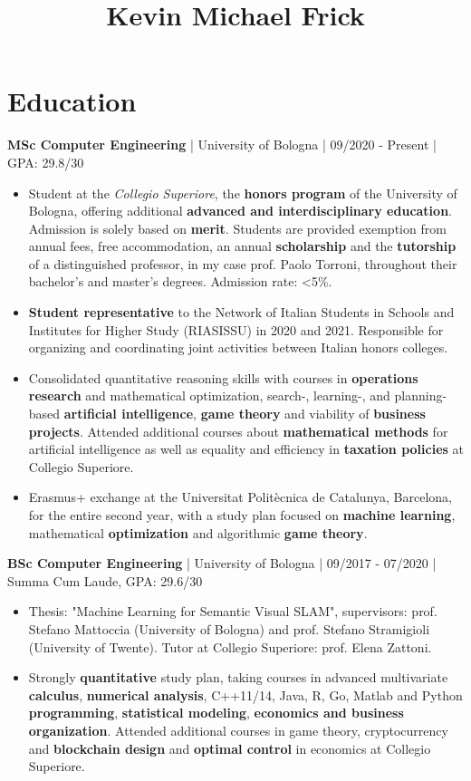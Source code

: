 \documentclass[10pt, a4paper]{extarticle}
\title{Kevin Michael Frick}
\author{}
\begin{document}
\maketitle
\vspace{-0.8em}
\hrulefill


\section*{Education}

\textbf{MSc Computer Engineering} | University of Bologna | 09/2020 - Present | GPA: 29.8/30
\begin{itemize}
  \item Student at the \emph{Collegio Superiore}, the \textbf{honors program} of the University of Bologna, offering additional \textbf{advanced and interdisciplinary education}.
    Admission is solely based on \textbf{merit}.
    Students are provided exemption from annual fees, free accommodation, an annual \textbf{scholarship} and the \textbf{tutorship} of a distinguished professor, in my case prof. Paolo Torroni, throughout their bachelor's and master's degrees.
    Admission rate: <5\%.
  \item \textbf{Student representative} to the Network of Italian Students in Schools and Institutes for Higher Study (RIASISSU) in 2020 and 2021.
    Responsible for organizing and coordinating joint activities between Italian honors colleges.
  \item Consolidated quantitative reasoning skills with courses in \textbf{operations research} and mathematical optimization, search-, learning-, and planning-based \textbf{artificial intelligence}, \textbf{game theory} and viability of \textbf{business projects}.
    Attended additional courses about \textbf{mathematical methods} for artificial intelligence as well as equality and efficiency in \textbf{taxation policies} at Collegio Superiore.
  \item Erasmus+ exchange at the Universitat Politècnica de Catalunya, Barcelona, for the entire second year, with a study plan focused on \textbf{machine learning}, mathematical \textbf{optimization} and algorithmic \textbf{game theory}.

\end{itemize}
\textbf{BSc Computer Engineering} | University of Bologna | 09/2017 - 07/2020 | Summa Cum Laude, GPA: 29.6/30
\begin{itemize}
  \item Thesis: "Machine Learning for Semantic Visual SLAM", supervisors: prof. Stefano Mattoccia (University of Bologna) and prof. Stefano Stramigioli (University of Twente). Tutor at Collegio Superiore: prof. Elena Zattoni.
  \item Strongly \textbf{quantitative} study plan, taking courses in advanced multivariate \textbf{calculus}, \textbf{numerical analysis}, C++11/14, Java, R, Go, Matlab and Python \textbf{programming}, \textbf{statistical modeling}, \textbf{economics and business organization}.
    Attended additional courses in game theory, cryptocurrency and \textbf{blockchain design} and \textbf{optimal control} in economics at Collegio Superiore.
\end{itemize}
\end{document}
